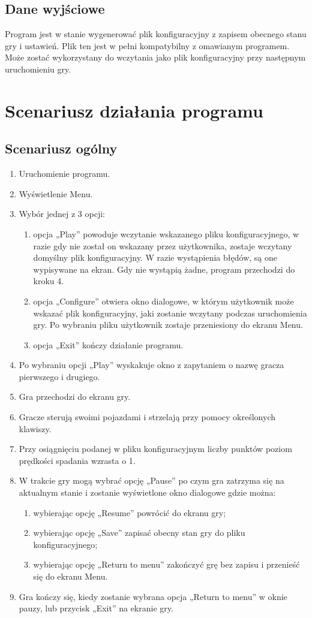 \documentclass[12pt]{report}
\begin{document}
\subsection{Dane wyjściowe}
Program jest w stanie wygenerować plik konfiguracyjny z zapisem obecnego stanu gry i ustawień. Plik ten jest w pełni kompatybilny z omawianym programem. Może zostać wykorzystany do wczytania jako plik konfiguracyjny przy następnym uruchomieniu gry. 
\section{Scenariusz działania programu}
\subsection{Scenariusz ogólny}
\begin{enumerate}
    \item Uruchomienie programu.
    \item Wyświetlenie Menu.
    \item Wybór jednej z 3 opcji: 
    \begin{enumerate}
        \item opcja „Play” powoduje wczytanie wskazanego pliku konfiguracyjnego, w razie gdy nie został on wskazany przez użytkownika, zostaje wczytany domyślny plik konfiguracyjny. W razie wystąpienia błędów, są one wypisywane na ekran. Gdy nie wystąpią żadne, program przechodzi do kroku 4. 
        \item opcja „Configure” otwiera okno dialogowe, w którym użytkownik może wskazać plik konfiguracyjny, jaki zostanie wczytany podczas uruchomienia gry. Po wybraniu pliku użytkownik zostaje przeniesiony do ekranu Menu. 
        \item opcja „Exit” kończy działanie programu. 
    \end{enumerate}
    \item Po wybraniu opcji „Play” wyskakuje okno z zapytaniem o nazwę gracza pierwszego i drugiego. 
    \item Gra przechodzi do ekranu gry. 
    \item Gracze sterują swoimi pojazdami i strzelają przy pomocy określonych klawiszy. 
    \item Przy osiągnięciu podanej w pliku konfiguracyjnym liczby punktów poziom prędkości spadania wzrasta o 1. 
    \item W trakcie gry mogą wybrać opcję „Pause” po czym gra zatrzyma się na aktualnym stanie i zostanie wyświetlone okno dialogowe gdzie można: 
    \begin{enumerate}
        \item wybierając opcję „Resume” powrócić do ekranu gry; 
        \item wybierając opcję „Save” zapisać obecny stan gry do pliku konfiguracyjnego;
        \item wybierając opcję „Return to menu” zakończyć grę bez zapisu i przenieść się do ekranu Menu.
    \end{enumerate}
    \item Gra kończy się, kiedy zostanie wybrana opcja „Return to menu” w oknie pauzy, lub przycisk „Exit” na ekranie gry. 
\end{enumerate}
\end{document}
